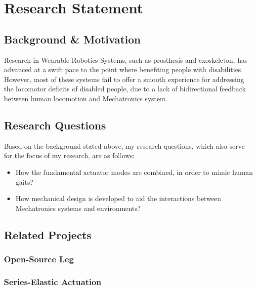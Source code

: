 \documentclass[12pt]{article}
\begin{document}
\tableofcontents

\newpage


\section{Research Statement}

    \subsection{Background \& Motivation}

    Research in Wearable Robotics Systems, such as prosthesis and exoskeleton, has advanced at a swift pace to the point where benefiting people with disabilities. However, most of these systems fail to offer a smooth experience for addressing the locomotor deficits of disabled people, due to a lack of bidirectional feedback between human locomotion and Mechatronics system. 

    

    \subsection{Research Questions}
        Based on the background stated above, my research questions, which also serve for the focus of my research, are as follows:
        \begin{itemize}
                
                \item {How the fundamental actuator modes are combined, in order to mimic human gaits?}
                \item {How mechanical design is developed to aid the interactions between Mechatronics systems and environments?}
        
        \end{itemize}
        

    \subsection{Related Projects}

        \subsubsection{Open-Source Leg}
            
            \subsubsection{Series-Elastic Actuation}
\end{document}
